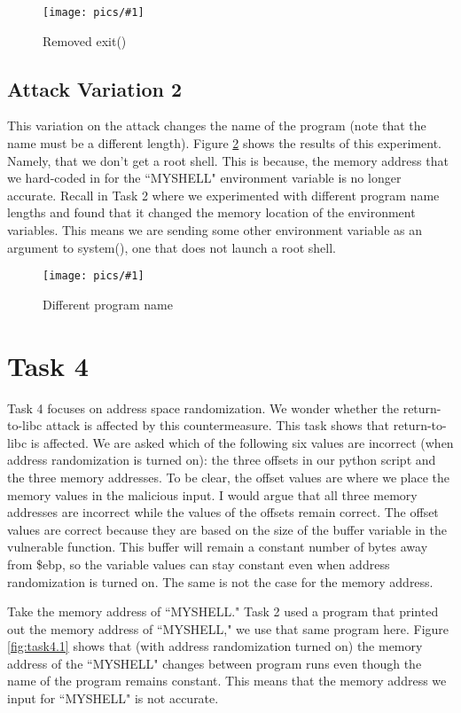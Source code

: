 \documentclass[11pt]{article}
\newcommand{\fig}[2]{ 
\begin{figure}[h]
	\centering
	\caption{#2}
	\texttt{[image: pics/\#1]}
	\label{fig:#1}
\end{figure} 
}
\begin{document}
\fig{task3.5}{Removed exit()}

\subsection*{Attack Variation 2}

This variation on the attack changes the name of the program (note that the name must be a different length). Figure \ref{fig:task3.6} shows the results of this experiment. Namely, that we don't get a root shell. This is because, the memory address that we hard-coded in for the ``MYSHELL" environment variable is no longer accurate. Recall in Task 2 where we experimented with different program name lengths and found that it changed the memory location of the environment variables. This means we are sending some other environment variable as an argument to system(), one that does not launch a root shell.

\fig{task3.6}{Different program name}

\newpage

\section*{Task 4}

Task 4 focuses on address space randomization. We wonder whether the return-to-libc attack is affected by this countermeasure. This task shows that return-to-libc is affected. We are asked which of the following six values are incorrect (when address randomization is turned on): the three offsets in our python script and the three memory addresses. To be clear, the offset values are where we place the memory values in the malicious input. I would argue that all three memory addresses are incorrect while the values of the offsets remain correct. The offset values are correct because they are based on the size of the buffer variable in the vulnerable function. This buffer will remain a constant number of bytes away from \$ebp, so the variable values can stay constant even when address randomization is turned on. The same is not the case for the memory address.

Take the memory address of ``MYSHELL." Task 2 used a program that printed out the memory address of ``MYSHELL," we use that same program here. Figure \ref{fig:task4.1} shows that (with address randomization turned on) the memory address of the ``MYSHELL" changes between program runs even though the name of the program remains constant. This means that the memory address we input for ``MYSHELL" is not accurate.
\end{document}
